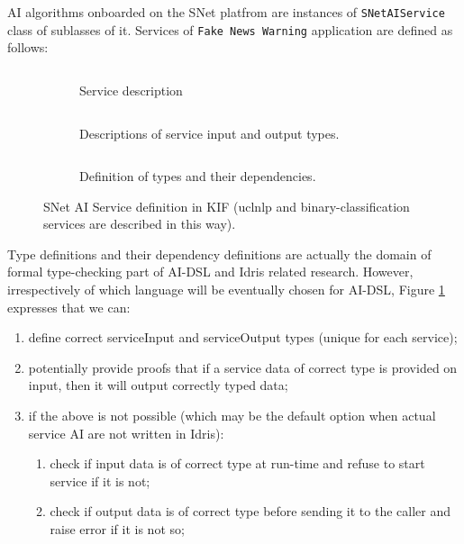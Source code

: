 \documentclass[]{report}
\begin{document}
AI algorithms onboarded on the SNet platfrom are instances of
\texttt{SNetAIService} class of sublasses of it.
Services of \texttt{Fake News Warning} application are defined as follows:

\begin{figure}[H]
  \begin{subfigure}[b]{1\textwidth}
    \centering
    \inputminted[firstline=1, lastline=2, linenos,tabsize=2,breaklines, fontsize=\small]{scm}{../../../ontology/uclnlp.kif}
    \vspace{-0.3cm}
    \captionsetup{width=0.8\linewidth}
    \caption{Service description}
    \vspace{0.3cm}
  \end{subfigure}
  \begin{subfigure}[b]{1\textwidth}
    \centering
    \inputminted[firstline=4, lastline=8, linenos,tabsize=2,breaklines, fontsize=\small]{scm}{../../../ontology/uclnlp.kif}
    \vspace{-0.3cm}
    \captionsetup{width=0.8\linewidth}
    \caption{Descriptions of service input and output types.}
    \vspace{0.3cm}
  \end{subfigure}
  \begin{subfigure}[b]{1\textwidth}
    \centering
    \inputminted[firstline=10, lastline=26, linenos,tabsize=2,breaklines, fontsize=\small]{scm}{../../../ontology/uclnlp.kif}
    \vspace{-0.3cm}
    \captionsetup{width=0.8\linewidth}
    \caption{Definition of types and their dependencies.}
  \end{subfigure}
\caption{\label{fig:serviceDefinitionKif}SNet AI Service definition in KIF
(uclnlp and binary-classification services are described in this way).}
\end{figure}

Type definitions and their dependency definitions are actually the domain of
formal type-checking part of AI-DSL and Idris related research. However,
irrespectively of which language will be eventually chosen for AI-DSL, Figure
\ref{fig:serviceDefinitionKif} expresses that we can:
\begin{enumerate}
  \item define correct serviceInput and serviceOutput types (unique for each
  service);
  \item potentially provide proofs that if a service data of correct type is
  provided on input, then it will output correctly typed data;
  \item if the above is not possible (which may be the default option when actual
  service AI are not written in Idris):
  \begin{enumerate}
    \item check if input data is of correct type at run-time and refuse to start
    service if it is not;
    \item check if output data is of correct type before sending it to the
    caller and raise error if it is not so;
  \end{enumerate}
\end{enumerate}
\end{document}
